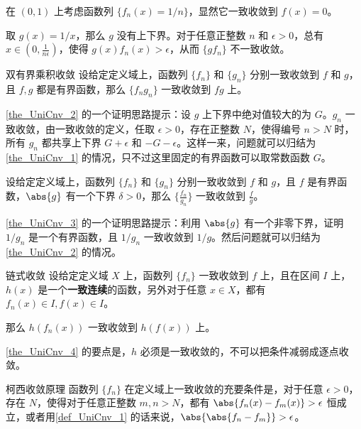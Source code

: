 \begin{example}{}\label{ex_UniCnv_3}
在 $(0, 1)$ 上考虑函数列 $\{f_n(x)=1/n\}$，显然它一致收敛到 $f(x)=0$。

取 $g(x)=1/x$，那么 $g$ 没有上下界。对于任意正整数 $n$ 和 $\epsilon>0$，总有 $x\in(0, \frac{1}{n\epsilon})$，使得 $g(x)f_n(x)>\epsilon$，从而 $\{gf_n\}$ 不一致收敛。
\end{example}

\begin{theorem}{双有界乘积收敛}\label{the_UniCnv_2}
设给定定义域上，函数列 $\{f_n\}$ 和 $\{g_n\}$ 分别一致收敛到 $f$ 和 $g$，且 $f, g$ 都是有界函数，那么 $\{f_ng_n\}$ 一致收敛到 $fg$ 上。
\end{theorem}

\autoref{the_UniCnv_2} 的一个证明思路提示：设 $g$ 上下界中绝对值较大的为 $G$。$g_n$ 一致收敛，由一致收敛的定义，任取 $\epsilon>0$，存在正整数 $N$，使得编号 $n>N$ 时，所有 $g_n$ 都共享上下界 $G+\epsilon$ 和 $-G-\epsilon$。这样一来，问题就可以归结为\autoref{the_UniCnv_1} 的情况，只不过这里固定的有界函数可以取常数函数 $G$。

\begin{theorem}{}\label{the_UniCnv_3}
设给定定义域上，函数列 $\{f_n\}$ 和 $\{g_n\}$ 分别一致收敛到 $f$ 和 $g$，且 $f$ 是有界函数，$\abs{g}$ 有一个下界 $\delta>0$，那么 $\{\frac{f_n}{g_n}\}$ 一致收敛到 $\frac{f}{g}$。
\end{theorem}

\autoref{the_UniCnv_3} 的一个证明思路提示：利用 $\abs{g}$ 有一个非零下界，证明 $1/g_n$ 是一个有界函数，且 $1/g_n$ 一致收敛到 $1/g$。然后问题就可以归结为\autoref{the_UniCnv_2} 的情况。

\begin{theorem}{链式收敛}\label{the_UniCnv_4}
设给定定义域 $X$ 上，函数列 $\{f_n\}$ 一致收敛到 $f$ 上，且在区间 $I$ 上，$h(x)$ 是一个\textbf{一致连续}的函数，另外对于任意 $x\in X$，都有 $f_n(x)\in I, f(x)\in I$。

那么 $h(f_n(x))$ 一致收敛到 $h(f(x))$ 上。
\end{theorem}

\autoref{the_UniCnv_4} 的要点是，$h$ 必须是一致收敛的，不可以把条件减弱成逐点收敛。

\begin{theorem}{柯西收敛原理}\label{the_UniCnv_6}
函数列 $\{f_n\}$ 在定义域上一致收敛的充要条件是，对于任意 $\epsilon>0$，存在 $N$，使得对于任意正整数 $m, n>N$，都有 $\abs{f_n(x)-f_m(x)}>\epsilon$ 恒成立，或者用\autoref{def_UniCnv_1} 的话来说，$\abs{\abs{f_n-f_m}}>\epsilon$。
\end{theorem}

